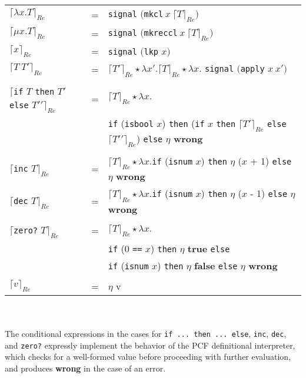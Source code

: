 \documentclass[a4paper,10pt]{article}
\begin{document}
\begin{tabular}[t]{lll}

$\lceil \lambda x . T\rceil_{Re}$ &=& \texttt{signal} $($\texttt{mkcl}$\ x\ \lceil T \rceil_{Re})$\\
$\lceil \mu x . T\rceil_{Re}$ &=& \texttt{signal} $($\texttt{mkreccl}$\ x\ \lceil T \rceil_{Re})$\\
$\lceil x \rceil_{Re}$ &=& \texttt{signal} $($\texttt{lkp} $x)$\\
$\lceil T\ T\prime\rceil_{Re}$ &=& $\lceil T\prime \rceil_{Re} \star  \lambda x\prime . \lceil T \rceil_{Re}
  \star \lambda x . $ \texttt{signal} $($\texttt{apply} $x\ x\prime)$\\
\\
$\lceil $\texttt{if} $T$ \texttt{then} $T\prime$ \texttt{else} $T\prime\prime \rceil_{Re}$ &=&
  $\lceil T \rceil_{Re} \star \lambda x.$\\
    &&\texttt{if} (\texttt{isbool} $x$) \texttt{then} (\texttt{if} $x$ \texttt{then} $\lceil T\prime \rceil_{Re}$ \texttt{else} $\lceil T\prime\prime \rceil_{Re}$) \texttt{else} $\eta$ \textbf{wrong}\\
\\
$\lceil$\texttt{inc} $ T\rceil_{Re}$ &=& $\lceil T \rceil_{Re} \star \lambda x . $\texttt{if} (\texttt{isnum} $x$) \texttt{then} $\eta$ ($x$ + 1) \texttt{else} $\eta$ \textbf{wrong}\\
$\lceil$\texttt{dec} $ T\rceil_{Re}$ &=& $\lceil T \rceil_{Re} \star \lambda x . $\texttt{if} (\texttt{isnum} $x$) \texttt{then} $\eta$ ($x$ - 1) \texttt{else} $\eta$ \textbf{wrong}\\
\\
$\lceil $\texttt{zero?} $T \rceil_{Re}$ &=& $\lceil T \rceil_{Re} \star \lambda x . $\\
  &&\texttt{if} (0 \texttt{==} $x$) \texttt{then} $\eta$ \textbf{true} \texttt{else}\\
  && \texttt{if} (\texttt{isnum} $x$) \texttt{then} $\eta$ \textbf{false} \texttt{else} $\eta$ \textbf{wrong}\\
\\
$\lceil v \rceil_{Re}$ &=& $\eta$ v\\

\end{tabular}
\\
\\
The conditional expressions in the cases for \texttt{if ... then ... else}, \texttt{inc}, \texttt{dec}, and \texttt{zero?} expressly implement the behavior of the PCF definitional interpreter, which checks for a well-formed value before proceeding with further evaluation, and produces \textbf{wrong} in the case of an error.
\end{document}
